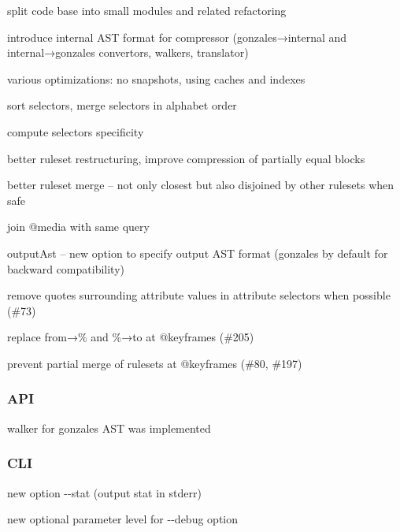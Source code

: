 \begin{DoxyItemize}
\item split code base into small modules and related refactoring
\item introduce internal A\+ST format for compressor ({\ttfamily gonzales}→{\ttfamily internal} and {\ttfamily internal}→{\ttfamily gonzales} convertors, walkers, translator)
\item various optimizations\+: no snapshots, using caches and indexes
\item sort selectors, merge selectors in alphabet order
\item compute selector\textquotesingle{}s specificity
\item better ruleset restructuring, improve compression of partially equal blocks
\item better ruleset merge – not only closest but also disjoined by other rulesets when safe
\item join {\ttfamily @media} with same query
\item {\ttfamily output\+Ast} – new option to specify output A\+ST format ({\ttfamily gonzales} by default for backward compatibility)
\item remove quotes surrounding attribute values in attribute selectors when possible (\#73)
\item replace {\ttfamily from}→{\%} and {\%}→{\ttfamily to} at {\ttfamily @keyframes} (\#205)
\item prevent partial merge of rulesets at {\ttfamily @keyframes} (\#80, \#197)
\end{DoxyItemize}

\subsubsection*{A\+PI}


\begin{DoxyItemize}
\item walker for {\ttfamily gonzales} A\+ST was implemented
\end{DoxyItemize}

\subsubsection*{C\+LI}


\begin{DoxyItemize}
\item new option {\ttfamily -\/-\/stat} (output stat in {\ttfamily stderr})
\item new optional parameter {\ttfamily level} for {\ttfamily -\/-\/debug} option
\end{DoxyItemize}

